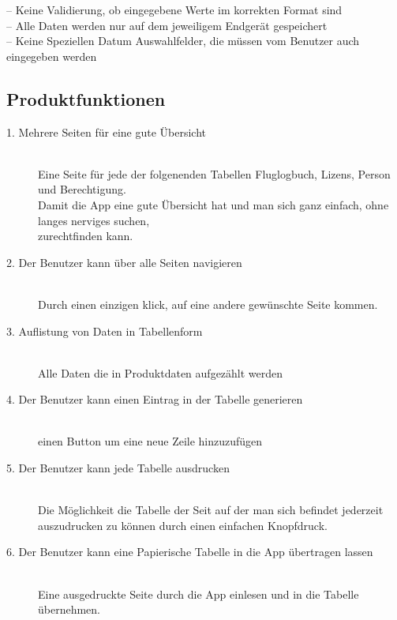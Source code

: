 \documentclass[a4paper]{article} %
\begin{document}
    \begin{description}
        \item[-- Keine Validierung, ob eingegebene Werte im korrekten Format sind]
        \item[-- Alle Daten werden nur auf dem jeweiligem Endgerät gespeichert]
        \item[-- Keine Speziellen Datum Auswahlfelder, die müssen vom Benutzer auch eingegeben werden] 
    \end{description}
    \pagebreak
    
    \subsection{Produktfunktionen}
    \vspace{1cm}
    \begin{description}
    \item[1. Mehrere Seiten für eine gute Übersicht]\hfill\\
    Eine Seite für jede der folgenenden Tabellen Fluglogbuch, Lizens, Person und Berechtigung.\\ Damit die App eine gute Übersicht hat und man sich ganz einfach, ohne langes nerviges suchen, \\zurechtfinden kann.
    \item[2. Der Benutzer kann über alle Seiten navigieren]\hfill\\
    Durch einen einzigen klick, auf eine andere gewünschte Seite kommen.
    \item[3. Auflistung von Daten in Tabellenform]\hfill \\
    Alle Daten die  in Produktdaten aufgezählt werden
    \item[4. Der Benutzer kann einen Eintrag in der Tabelle generieren]\hfill \\
    einen Button um eine neue Zeile hinzuzufügen
    \item[5. Der Benutzer kann jede Tabelle ausdrucken]\hfill \\
    Die Möglichkeit die Tabelle der Seit auf der man sich befindet jederzeit auszudrucken zu können durch einen einfachen Knopfdruck.
    \item[6. Der Benutzer kann eine Papierische Tabelle in die App übertragen lassen]\hfill\\
        Eine ausgedruckte Seite durch die App einlesen und in die Tabelle übernehmen.
    \end{description}
    \pagebreak
\end{document}
